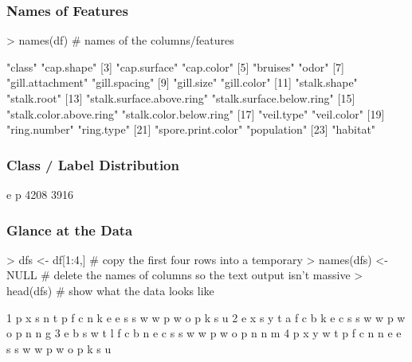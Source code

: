 \documentclass[10pt]{article}         %
\begin{document}
\subsubsection{Names of Features}
\begin{Schunk}
\begin{Sinput}
> names(df) # names of the columns/features
\end{Sinput}
\begin{Soutput}
 [1] "class"                    "cap.shape"               
 [3] "cap.surface"              "cap.color"               
 [5] "bruises"                  "odor"                    
 [7] "gill.attachment"          "gill.spacing"            
 [9] "gill.size"                "gill.color"              
[11] "stalk.shape"              "stalk.root"              
[13] "stalk.surface.above.ring" "stalk.surface.below.ring"
[15] "stalk.color.above.ring"   "stalk.color.below.ring"  
[17] "veil.type"                "veil.color"              
[19] "ring.number"              "ring.type"               
[21] "spore.print.color"        "population"              
[23] "habitat"                 
\end{Soutput}
\end{Schunk}

\subsubsection{Class / Label Distribution}
\begin{Schunk}
\begin{Soutput}
   e    p 
4208 3916 
\end{Soutput}
\end{Schunk}


\subsubsection{Glance at the Data}
\begin{Schunk}
\begin{Sinput}
> dfs <- df[1:4,] # copy the first four rows into a temporary
> names(dfs) <- NULL # delete the names of columns so the text output isn't massive
> head(dfs) # show what the data looks like
\end{Sinput}
\begin{Soutput}
1 p x s n t p f c n k e e s s w w p w o p k s u
2 e x s y t a f c b k e c s s w w p w o p n n g
3 e b s w t l f c b n e c s s w w p w o p n n m
4 p x y w t p f c n n e e s s w w p w o p k s u
\end{Soutput}
\end{Schunk}
\end{document}
